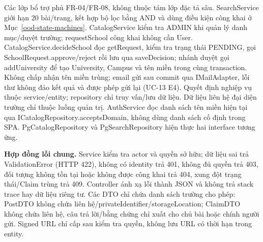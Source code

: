 Các lớp bổ trợ phủ FR-04/FR-08, không thuộc tám lớp đặc tả sâu. SearchService giới hạn 20 bài/trang, kết hợp bộ lọc bằng AND và dùng điều kiện công khai ở Mục~\ref{ood-state-machines}. CatalogService kiểm tra ADMIN khi quản lý danh mục/duyệt trường; requestSchool công khai không cần User. CatalogService.decideSchool đọc getRequest, kiểm tra trạng thái PENDING, gọi SchoolRequest.approve/reject rồi lưu qua saveDecision; nhánh duyệt gọi addUniversity để tạo University, Campus và tên miền trong cùng transaction. Không chấp nhận tên miền trùng; email gửi sau commit qua IMailAdapter, lỗi thư không đảo kết quả và được phép gửi lại (UC-13 E4). Quyết định nghiệp vụ thuộc service/entity; repository chỉ truy vấn/lưu dữ liệu. Dữ liệu liên hệ đại diện trường chỉ thuộc luồng quản trị. AuthService đọc danh sách tên miền hiện tại qua ICatalogRepository.acceptsDomain, không dùng danh sách cố định trong SPA. PgCatalogRepository và PgSearchRepository hiện thực hai interface tương ứng.

\textbf{Hợp đồng lỗi chung.} Service kiểm tra actor và quyền sở hữu; dữ liệu sai trả ValidationError (HTTP 422), không có identity trả 401, không đủ quyền trả 403, đối tượng không tồn tại hoặc không được công khai trả 404, xung đột trạng thái/Claim trùng trả 409. Controller ánh xạ lỗi thành JSON và không trả stack trace hay dữ liệu riêng tư. Các DTO chỉ chứa danh sách trường cho phép: PostDTO không chứa liên hệ/privateIdentifier/storageLocation; ClaimDTO không chứa liên hệ, câu trả lời/bằng chứng chỉ xuất cho chủ bài hoặc chính người gửi. Signed URL chỉ cấp sau kiểm tra quyền, không lưu URL có thời hạn trong entity.
